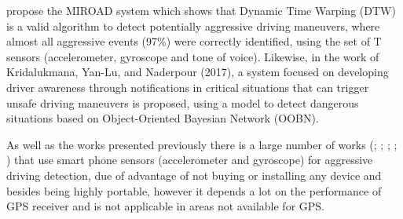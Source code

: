 \vspace{5mm} %

 propose the MIROAD system which shows that Dynamic Time Warping (DTW) is a valid algorithm to detect potentially aggressive driving maneuvers, where almost all aggressive events (97\%) were correctly identified, using the set of T sensors (accelerometer, gyroscope and tone of voice). Likewise, in the work of Kridalukmana, Yan-Lu, and Naderpour (2017), a system focused on developing driver awareness through notifications in critical situations that can trigger unsafe driving maneuvers is proposed, using a model to detect dangerous situations based on Object-Oriented Bayesian Network (OOBN).

\vspace{5mm} %

As well as the works presented previously there is a large number of works (; ; ; ; ) that use smart phone sensors (accelerometer and gyroscope) for aggressive driving detection, due of advantage of not buying or installing any device and besides being highly portable, however it depends a lot on the performance of GPS receiver and is not applicable in areas not available for GPS.

